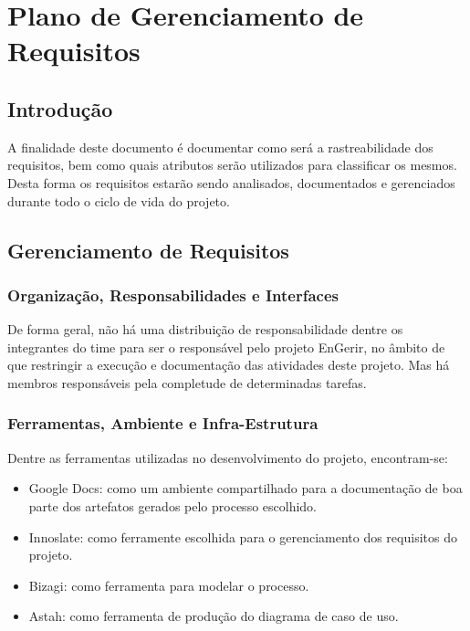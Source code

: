 \chapter{Plano de Gerenciamento de Requisitos}
\label{gerency}

\section{Introdução}

A finalidade deste documento é documentar como será a rastreabilidade dos requisitos, bem como quais atributos serão utilizados para classificar os mesmos. Desta forma os requisitos estarão sendo analisados, documentados e gerenciados durante todo o ciclo de vida do projeto.

\section{Gerenciamento de Requisitos}

\subsection{Organização, Responsabilidades e Interfaces}

De forma geral, não há uma distribuição de responsabilidade dentre os integrantes do time para ser o responsável pelo projeto EnGerir, no âmbito de que restringir a execução e documentação das atividades deste projeto. Mas há membros responsáveis pela completude de determinadas tarefas.

\subsection{ Ferramentas, Ambiente e Infra-Estrutura}

Dentre as ferramentas utilizadas no desenvolvimento do projeto, encontram-se:

\begin{itemize}
\item Google Docs: como um ambiente compartilhado para a documentação de boa parte dos artefatos gerados pelo processo escolhido.
\item Innoslate: como ferramente escolhida para o gerenciamento dos requisitos do projeto.
\item Bizagi: como ferramenta para modelar o processo.
\item Astah: como ferramenta de produção do diagrama de caso de uso.
\end{itemize}

